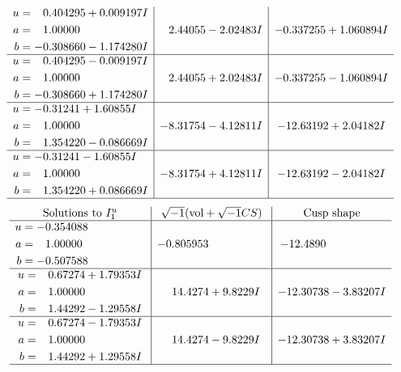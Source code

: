 \documentclass[1p]{elsarticle_modified}
\theoremstyle{definition}
\newcommand{\I}{\sqrt{-1}}
\begin{document}
$$\begin{array}{c|c|c}
\begin{aligned}
u &= \phantom{-}0.404295 + 0.009197 I \\
a &= \phantom{-}1.00000\phantom{ +0.000000I} \\
b &= -0.308660 - 1.174280 I\end{aligned}
 & \phantom{-}2.44055 - 2.02483 I & -0.337255 + 1.060894 I \\ \hline\begin{aligned}
u &= \phantom{-}0.404295 - 0.009197 I \\
a &= \phantom{-}1.00000\phantom{ +0.000000I} \\
b &= -0.308660 + 1.174280 I\end{aligned}
 & \phantom{-}2.44055 + 2.02483 I & -0.337255 - 1.060894 I \\ \hline\begin{aligned}
u &= -0.31241 + 1.60855 I \\
a &= \phantom{-}1.00000\phantom{ +0.000000I} \\
b &= \phantom{-}1.354220 - 0.086669 I\end{aligned}
 & -8.31754 - 4.12811 I & -12.63192 + 2.04182 I \\ \hline\begin{aligned}
u &= -0.31241 - 1.60855 I \\
a &= \phantom{-}1.00000\phantom{ +0.000000I} \\
b &= \phantom{-}1.354220 + 0.086669 I\end{aligned}
 & -8.31754 + 4.12811 I & -12.63192 - 2.04182 I\\
 \hline 
 \end{array}$$\newpage$$\begin{array}{c|c|c}  
\text{Solutions to }I^u_{1}& \I (\text{vol} + \sqrt{-1}CS) & \text{Cusp shape}\\
 \hline 
\begin{aligned}
u &= -0.354088\phantom{ +0.000000I} \\
a &= \phantom{-}1.00000\phantom{ +0.000000I} \\
b &= -0.507588\phantom{ +0.000000I}\end{aligned}
 & -0.805953\phantom{ +0.000000I} & -12.4890\phantom{ +0.000000I} \\ \hline\begin{aligned}
u &= \phantom{-}0.67274 + 1.79353 I \\
a &= \phantom{-}1.00000\phantom{ +0.000000I} \\
b &= \phantom{-}1.44292 - 1.29558 I\end{aligned}
 & \phantom{-}14.4274 + 9.8229 I & -12.30738 - 3.83207 I \\ \hline\begin{aligned}
u &= \phantom{-}0.67274 - 1.79353 I \\
a &= \phantom{-}1.00000\phantom{ +0.000000I} \\
b &= \phantom{-}1.44292 + 1.29558 I\end{aligned}
 & \phantom{-}14.4274 - 9.8229 I & -12.30738 + 3.83207 I\\
 \hline 
 \end{array}$$\newpage\newpage\renewcommand{\arraystretch}{1}
\end{document}

